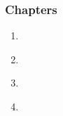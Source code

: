 \begin{frame}[fragile,label=outline] 
\frametitle{Chapters}
\begin{center}
\begin{minipage}{3.25in}
\begin{enumerate}
\item  \hyperlink{s-intro<1>}      {\BUTTON {\orow{\sIntro}}} \\
\item  \hyperlink{s-present<1>}    {\BUTTON {\erow{\sPresent}}} \\
\item  \hyperlink{s-project<1>}    {\BUTTON {\erow{\sProject}}} \\
\item  \hyperlink{s-future<1>}     {\BUTTON {\orow{\sFuture}}} \\
\end{enumerate}
\end{minipage}
\end{center}
\end{frame}


% 
\NEWMOD

\section{\sIntro}


